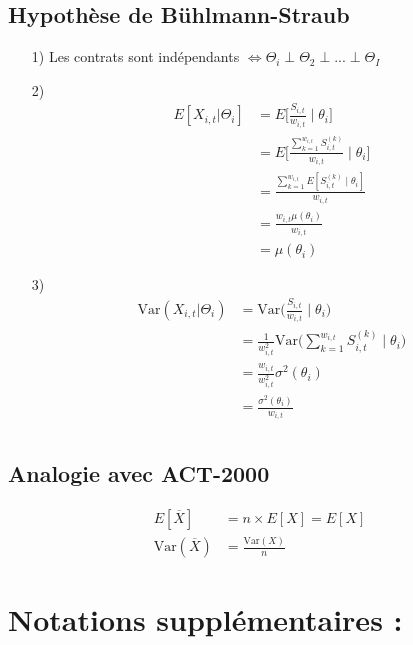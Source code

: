 \documentclass[11pt,french]{report}
\begin{document}
\subsection*{Hypothèse de Bühlmann-Straub}
\begin{itemize}
\item[1)] Les contrats sont indépendants $\Leftrightarrow \Theta_i \perp \Theta_2 \perp...\perp\Theta_I$
\item[2)] \begin{align*}
E[X_{i,t}|\Theta_i] &= E \Big[\frac{S_{i,t}}{w_{i,t}} \mid \theta_i \Big] \\
&= E \Big[\frac{\sum_{k=1}^{w_{i,t}} S_{i,t}^{(k)}}{w_{i,t}} \mid \theta_i \Big] \\
&= \frac{\sum_{k=1}^{w_{i,t}} E[ S_{i,t}^{(k)}\mid \theta_i]}{w_{i,t}} \\
&= \frac{w_{i,t} \mu(\theta_i) }{w_{i,t}} \\
&=\mu(\theta_i)
\end{align*}
\item[3)] \begin{align*}
\text{Var}( X_{i,t}|\Theta_i) &= \text{Var} \Big(\frac{S_{i,t}}{w_{i,t}} \mid \theta_i \Big) \\
&= \frac{1}{w_{i,t}^2} \text{Var} \Big(\sum_{k=1}^{w_{i,t}}S_{i,t}^{(k)}\mid \theta_i \Big)\\
&=\frac{w_{i,t}}{w_{i,t}^2} \sigma^2(\theta_i) \\
&= \frac{\sigma^2(\theta_i)}{w_{i,t}}\\
\end{align*}

\end{itemize}

\subsection*{Analogie avec ACT-2000}
\begin{align*}
E[\overline{X}] &= n \times E[X] = E[X] \\
\text{Var}(\overline{X}) &= \frac{\text{Var}(X) }{n}
\end{align*}
\section{Notations supplémentaires :}
\end{document}

